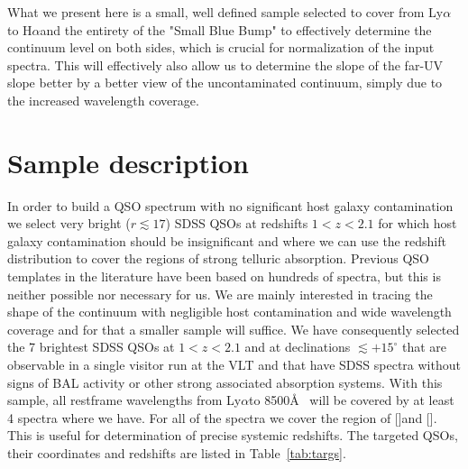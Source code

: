 \documentclass{aa}    %
\newcommand{\Tab}[1]{Table~\ref{tab:#1}}
\newcommand{\tab}[1]{\Tab{#1}}
\newcommand{\sectlabel}[1]{\label{sect:#1}}
\newcommand{\lya}{Ly$\alpha$}
\newcommand{\ha}{H$\alpha$}
\newcommand{\oii}{[\ion{O}{ii}]}
\newcommand{\oiii}{[\ion{O}{iii}]}
\begin{document}
 What we present here is a small, well defined sample selected to cover from \lya to \ha and the entirety of the "Small Blue Bump" to effectively determine the continuum level on both sides, which is crucial for normalization of the input spectra. This will effectively also allow us to determine the slope of the far-UV slope better by a better view of the uncontaminated continuum, simply due to the increased wavelength coverage. 


\section{Sample description}   \sectlabel{sample}


In order to build a QSO spectrum with no significant host galaxy contamination we select very bright ($r \lesssim 17$) SDSS QSOs at redshifts $1 < z < 2.1$ for which host galaxy contamination should be insignificant and where we can use the redshift distribution to cover the regions of strong telluric absorption. Previous QSO templates in the literature have been based on hundreds of spectra, but this is neither possible nor necessary for us. We are mainly interested in tracing the shape of the continuum with negligible host contamination and wide wavelength coverage and for that a smaller sample will suffice. We have consequently selected the 7 brightest SDSS QSOs at $1 < z < 2.1$ and at declinations $\lesssim +15^\circ$ that are observable in a single visitor run at the VLT and that have SDSS spectra without signs of BAL activity or other strong associated absorption systems. With this sample, all restframe wavelengths from \lya to 8500\AA~ will be covered by at least 4 spectra where we have. For all of the spectra we cover the region of \oii and \oiii. This is useful for determination of precise systemic redshifts. The targeted QSOs, their coordinates and redshifts are listed in \tab{targs}.
\end{document}
